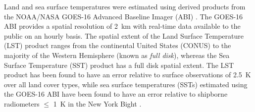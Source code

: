 Land and sea surface temperatures were estimated using derived products from the NOAA/NASA GOES-16 Advanced Baseline Imager (ABI) \citep{ignatov2010, yu2008}. The GOES-16 ABI provides a spatial resolution of \SI{2}{\kilo\meter} with real-time data available to the public on an hourly basis. The spatial extent of the Land Surface Temperature (LST) product ranges from the continental United States (CONUS) to the majority of the Western Hemisphere (known as \textit{full disk}), whereas the Sea Surface Temperature (SST) product has a full disk spatial extent. The LST product has been found to have an error relative to surface observations of \SI{2.5}{K} over all land cover types, while sea surface temperatures (SSTs) estimated using the GOES-16 ABI have been found to have an error relative to shipborne radiometers $\leq$ \SI{1}{\kelvin} in the New York Bight \citep{luo2021}.

